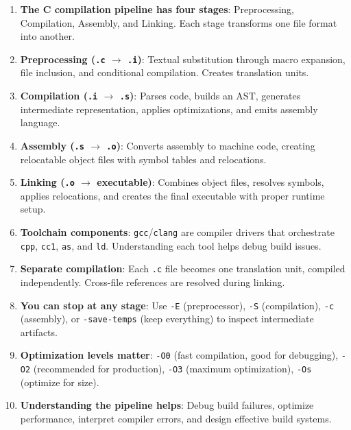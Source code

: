 \begin{enumerate}
    \item \textbf{The C compilation pipeline has four stages}: Preprocessing, Compilation, Assembly, and Linking. Each stage transforms one file format into another.

    \item \textbf{Preprocessing (\texttt{.c} $\to$ \texttt{.i})}: Textual substitution through macro expansion, file inclusion, and conditional compilation. Creates translation units.

    \item \textbf{Compilation (\texttt{.i} $\to$ \texttt{.s})}: Parses code, builds an AST, generates intermediate representation, applies optimizations, and emits assembly language.

    \item \textbf{Assembly (\texttt{.s} $\to$ \texttt{.o})}: Converts assembly to machine code, creating relocatable object files with symbol tables and relocations.

    \item \textbf{Linking (\texttt{.o} $\to$ executable)}: Combines object files, resolves symbols, applies relocations, and creates the final executable with proper runtime setup.

    \item \textbf{Toolchain components}: \texttt{gcc}/\texttt{clang} are compiler drivers that orchestrate \texttt{cpp}, \texttt{cc1}, \texttt{as}, and \texttt{ld}. Understanding each tool helps debug build issues.

    \item \textbf{Separate compilation}: Each \texttt{.c} file becomes one translation unit, compiled independently. Cross-file references are resolved during linking.

    \item \textbf{You can stop at any stage}: Use \texttt{-E} (preprocessor), \texttt{-S} (compilation), \texttt{-c} (assembly), or \texttt{-save-temps} (keep everything) to inspect intermediate artifacts.

    \item \textbf{Optimization levels matter}: \texttt{-O0} (fast compilation, good for debugging), \texttt{-O2} (recommended for production), \texttt{-O3} (maximum optimization), \texttt{-Os} (optimize for size).

    \item \textbf{Understanding the pipeline helps}: Debug build failures, optimize performance, interpret compiler errors, and design effective build systems.
\end{enumerate}

